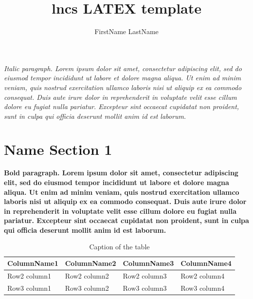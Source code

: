 \documentclass{llncs}
\begin{document}
\title{lncs LATEX template}

\author{FirstName LastName}

\maketitle 

\vspace{1cm} %

\textit{Italic paragraph. Lorem ipsum dolor sit amet, consectetur adipiscing elit, sed do eiusmod tempor incididunt ut labore et dolore magna aliqua. Ut enim ad minim veniam, quis nostrud exercitation ullamco laboris nisi ut aliquip ex ea commodo consequat. Duis aute irure dolor in reprehenderit in voluptate velit esse cillum dolore eu fugiat nulla pariatur. Excepteur sint occaecat cupidatat non proident, sunt in culpa qui officia deserunt mollit anim id est laborum.}


\section{Name Section 1}

\textbf{Bold paragraph. Lorem ipsum dolor sit amet, consectetur adipiscing elit, sed do eiusmod tempor incididunt ut labore et dolore magna aliqua. Ut enim ad minim veniam, quis nostrud exercitation ullamco laboris nisi ut aliquip ex ea commodo consequat. Duis aute irure dolor in reprehenderit in voluptate velit esse cillum dolore eu fugiat nulla pariatur. Excepteur sint occaecat cupidatat non proident, sunt in culpa qui officia deserunt mollit anim id est laborum.}

\begin{table}
    \label{tab:example1}
 	\caption{Caption of the table}
	\centering
	\begin{tabular}{C|CCC}
 		\toprule
 		ColumnName1 & ColumnName2 & ColumnName3  & ColumnName4 \\
 		\midrule
 		Row2 column1 & Row2 column2 & Row2 column3 & Row2 column4 \\
   		Row3 column1 & Row3 column2 & Row3 column3 & Row3 column4 \\
 		\bottomrule
 	\end{tabular}
\end{table}
 
\end{document}
